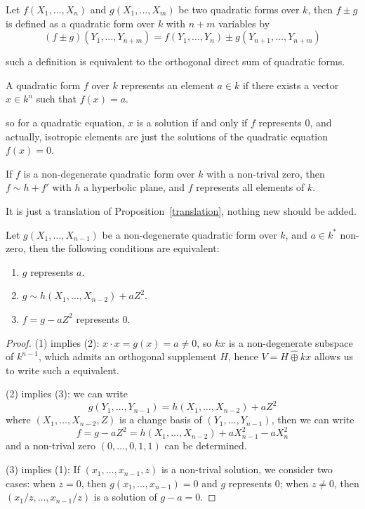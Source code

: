 \begin{definition}
    Let \(f(X_1,\dots,X_n) \) and \(g(X_1,...,X_m)\) be two quadratic forms over \(k\), then \(f \pm g\) is defined as a quadratic form over \(k\) with \(n+m\) variables by
    \[(f \pm g)(Y_1,\dots,Y_{n+m}) = f(Y_1,\dots,Y_n) \pm g(Y_{n+1},\dots,Y_{n+m})\]
\end{definition}

such a definition is equivalent to the orthogonal direct sum of quadratic forms.

\begin{definition}
    A quadratic form \(f\) over \(k\) represents an element \(a \in k\) if there exists a vector \(x \in k^n\) such that \(f(x) = a\).
\end{definition}

so for a quadratic equation, \(x\) is a solution if and only if \(f\) represents \(0\), and actually, isotropic elements are just the solutions of the quadratic equation \(f(x) = 0\).

\begin{proposition}
    If \(f\) is a non-degenerate quadratic form over \(k\) with a non-trival zero, then \(f \sim h + f'\) with \(h\) a hyperbolic plane, and \(f\) represents all elements of \(k\).
\end{proposition}

It is just a translation of Proposition~\ref{translation}, nothing new should be added.

\begin{colorcorollary}
    Let \(g(X_1,\dots,X_{n-1})\) be a non-degenerate quadratic form over \(k\), and \(a \in k^*\) non-zero, then the following conditions are equivalent:
    \begin{enumerate}
        \item \(g\) represents \(a\).
        \item \(g \sim h(X_1,\dots,X_{n-2}) + a Z^2\).
        \item \(f = g - aZ^2\) represents 0.
    \end{enumerate}
\end{colorcorollary}

\begin{proof}
    (1) implies (2): \(x \cdot x = g(x) = a \neq 0\), so \(kx\) is a non-degenerate subspace of \(k^{n-1}\), which admits an orthogonal supplement \(H\), hence \(V = H \hat{\oplus} kx\) allows us to write such a equivalent.

    (2) implies (3): we can write 
    \[g(Y_1,\dots,Y_{n-1}) = h(X_1,\dots,X_{n-2}) + a Z^2\]
    where \((X_1,\dots,X_{n-2},Z)\) is a change basis of \((Y_1,\dots,Y_{n-1})\), then we can write
    \[f = g-aZ^2 = h(X_1,\dots,X_{n-2}) + aX_{n-1}^2 - aX_n^2\]
    and a non-trival zero \((0,\dots,0,1,1)\) can be determined.

    (3) implies (1): If \((x_1,\dots,x_{n-1},z)\) is a non-trival solution, we consider two cases: when \(z = 0\), then \(g(x_1,\dots,x_{n-1}) = 0\) and \(g\) represents \(0\); when \(z \neq 0\), then \((x_1/z,\dots,x_{n-1}/z)\) is a solution of \(g - a =0\).
\end{proof}

